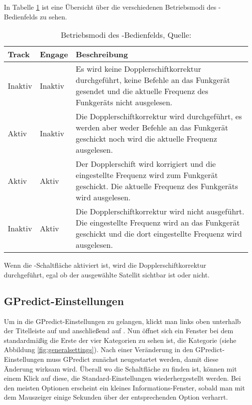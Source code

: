 In Tabelle \ref{tab:radiocontrolmodes} ist eine Übersicht über die verschiedenen Betriebsmodi des -Bedienfelds zu sehen.

\begin{table}[h]
	\begin{tabularx}{\textwidth}{|l|l|X|}
		\hline
		\textbf{Track} 	    & \textbf{Engage}	&\textbf{Beschreibung}\\
		\hline
		Inaktiv          	& Inaktiv 			& Es wird keine Dopplerschiftkorrektur durchgeführt, keine Befehle an das Funkgerät gesendet und die aktuelle Frequenz des Funkgeräts nicht ausgelesen.\\
		Aktiv              	& Inaktiv   		& Die Dopplerschiftkorrektur wird durchgeführt, es werden aber weder Befehle an das Funkgerät geschickt noch wird die aktuelle Frequenz ausgelesen.\\
		Aktiv              	& Aktiv	            & Der Dopplerschift wird korrigiert und die eingestellte Frequenz wird zum Funkgerät geschickt. Die aktuelle Frequenz des Funkgeräts wird ausgelesen.\\
		Inaktiv            	& Aktiv   			& Die Dopplerschiftkorrektur wird nicht ausgeführt. Die eingestellte Frequenz wird an das Funkgerät geschickt und die dort eingestellte Frequenz wird ausgelesen.\\
		\hline		
	\end{tabularx}
	\caption{Betriebsmodi des -Bedienfelds, Quelle: \cite{gpredictmanual}}
	\label{tab:radiocontrolmodes}
\end{table}

Wenn die -Schaltfläche aktiviert ist, wird die Dopplerschiftkorrektur durchgeführt, egal ob der ausgewählte Satellit sichtbar ist oder nicht.

\clearpage

\subsection{GPredict-Einstellungen}

Um in die GPredict-Einstellungen zu gelangen, klickt man links oben unterhalb der Titelleiste auf  und anschließend auf . Nun öffnet sich ein Fenster bei dem standardmäßig die Erste der vier Kategorien zu sehen ist, die Kategorie  (siehe Abbildung \ref{fig:generalsettings}). Nach einer Veränderung in den GPredict-Einstellungen muss GPredict zunächst neugestartet werden, damit diese Änderung wirksam wird. Überall wo die Schaltfläche  zu finden ist, können mit einem Klick auf diese, die Standard-Einstellungen wiederhergestellt werden. Bei den meisten Optionen erscheint ein kleines Informations-Fenster, sobald man mit dem Mauszeiger einige Sekunden über der entsprechenden Option verharrt.

